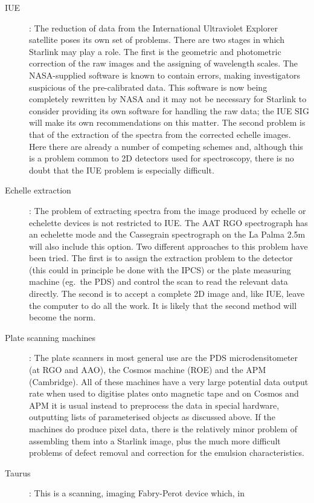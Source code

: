 \begin{description}
\begin{description}
\item [IUE]: The reduction of data from the International Ultraviolet Explorer
satellite poses its own set of problems.
There are two stages in which Starlink may play a role.
The first is the geometric and photometric correction of the raw images and the
assigning of wavelength scales.
The NASA-supplied software is known to contain errors, making investigators
suspicious of the pre-calibrated data.
This software is now being completely rewritten by NASA and it may not be
necessary for Starlink to consider providing its own software for handling the
raw data; the IUE SIG will make its own recommendations on this matter.
The second problem is that of the extraction of the spectra from the corrected
echelle images.
Here there are already a number of competing schemes and, although this is a
problem common to 2D detectors used for spectroscopy, there is no doubt that the
IUE problem is especially difficult.
\item [Echelle extraction]: The problem of extracting spectra from the image
produced by echelle or echelette devices is not restricted to IUE.
The AAT RGO spectrograph has an echelette mode and the Cassegrain spectrograph
on the La Palma 2.5m will also include this option.
Two different approaches to this problem have been tried.
The first is to assign the extraction problem to the detector (this could in
principle be done with the IPCS) or the plate measuring machine (eg.\ the PDS)
and control the scan to read the relevant data directly.
The second is to accept a complete 2D image and, like IUE, leave the computer
to do all the work.
It is likely that the second method will become the norm.
\item [Plate scanning machines]: The plate scanners in most general use are the
PDS microdensitometer (at RGO and AAO), the Cosmos machine (ROE) and the APM
(Cambridge).
All of these machines have a very large potential data output rate when used to
digitise plates onto magnetic tape and on Cosmos and APM it is usual instead to
preprocess the data in special hardware, outputting lists of parameterised
objects as discussed above.
If the machines do produce pixel data, there is the relatively minor problem of
assembling them into a Starlink image, plus the much more difficult problems of
defect removal and correction for the emulsion characteristics.
\item [Taurus]: This is a scanning, imaging Fabry-Perot device which, in

\end{description}
\end{description}
